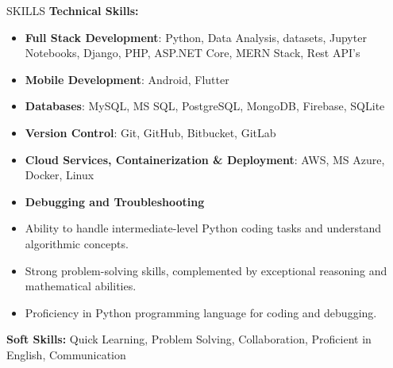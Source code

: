 \documentclass{resume} %
\begin{document}
\begin{rSection}{SKILLS}
\textbf{Technical Skills:}
\begin{itemize}
	\item \textbf{Full Stack Development}: Python, Data Analysis, datasets, Jupyter Notebooks, Django, PHP, ASP.NET Core, MERN Stack, Rest API's
	\item \textbf{Mobile Development}: Android, Flutter
	\item \textbf{Databases}: MySQL, MS SQL, PostgreSQL, MongoDB, Firebase, SQLite
	\item \textbf{Version Control}: Git, GitHub, Bitbucket, GitLab
	\item \textbf{Cloud Services, Containerization \& Deployment}: AWS, MS Azure, Docker, Linux
	\item \textbf{Debugging and Troubleshooting}
	\item Ability to handle intermediate-level Python coding tasks and understand algorithmic concepts.
	\item Strong problem-solving skills, complemented by exceptional reasoning and mathematical abilities.
	\item {Proficiency in Python programming language for coding and debugging.}
\end{itemize}
\textbf{Soft Skills:} Quick Learning, Problem Solving, Collaboration, Proficient in English, Communication


\end{rSection}
  
\end{document}
